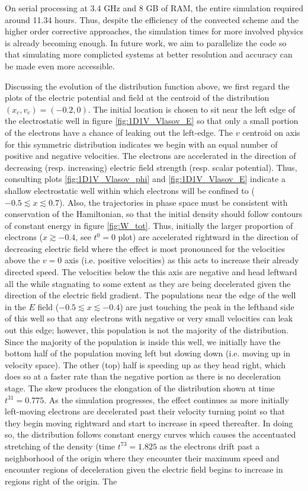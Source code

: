 \documentclass[11pt,titlepage]{report}
\begin{document}
On serial processing at 3.4 GHz and 8 GB of RAM, the entire simulation required around 11.34 hours. Thus, despite the efficiency of the convected scheme and the higher order corrective approaches, the simulation times for more involved physics is already becoming enough. In future work, we aim to parallelize the code so that simulating more complicted systems at better resolution and accuracy can be made even more accessible.

Discussing the evolution of the distribution function above, we first regard the plots of the electric potential and field at the centroid of the distribution $(x_c, v_c) = (-0.2,0)$. The initial location is chosen to sit near the left edge of the electrostatic well in figure \ref{fig:1D1V_Vlasov_E} so that only a small portion of the electrons have a chance of leaking out the left-edge. The $v$ centroid on axis for this symmetric distribution indicates we begin with an equal number of positive and negative velocities. The electrons are accelerated in the direction of decreasing (resp. increasing) electric field strength (resp. scalar potential). Thus, consulting plots \ref{fig:1D1V_Vlasov_phi} and \ref{fig:1D1V_Vlasov_E} indicate a shallow electrostatic well within which electrons will be confined to ($-0.5 \lesssim x \lesssim 0.7$). Also, the trajectories in phase space must be consistent with conservation of the Hamiltonian, so that the initial density should follow contours of constant energy in figure \ref{fig:W_tot}. Thus, initially the larger proportion of electrons ($x \gtrsim -0.4$, see $t^0 = 0$ plot) are accelerated rightward in the direction of decreasing electric field where the effect is most pronounced for the velocities above the $v = 0$ axis (i.e. positive velocities) as this acts to increase their already directed speed. The velocities below the this axis are negative and head leftward all the while stagnating to some extent as they are being decelerated given the direction of the electric field gradient. The populations near the edge of the well in the $E$ field ($-0.5 \lesssim x\lesssim -0.4$) are just touching the peak in the lefthand side of this well so that any electrons with negative or very small velocities can leak out this edge; however, this population is not the majority of the distribution. Since the majority of the population is inside this well, we initially have the bottom half of the population moving left but slowing down (i.e. moving up in velocity space). The other (top) half is speeding up as they head right, which does so at a faster rate than the negative portion as there is no deceleration stage. The skew produces the elongation of the distribution shown at time $t^{31} = 0.775$. As the simulation progresses, the effect continues as more initially left-moving electrons are decelerated past their velocity turning point so that they begin moving rightward and start to increase in speed thereafter. In doing so, the distribution follows constant energy curves which causes the accentuated stretching of the density (time $t^{73} = 1.825$ as the electrons drift past a neighborhood of the origin where they encounter their maximum speed and encounter regions of deceleration given the electric field begins to increase in regions right of the origin. The 
\end{document}
